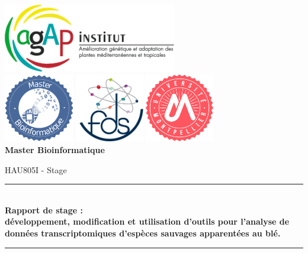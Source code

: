 \documentclass[../main]{subfiles} %
\begin{document}

\begin{titlepage}
\begin{center}
    \includegraphics[height=3cm]{Logos/logo_agap.png}\hspace{0.2cm}
    \\
	  \includegraphics[height=3cm]{Logos/logo_Bioinfo.png}\hspace{0.2cm}
	  \includegraphics[height=3cm]{Logos/logo_fds_rond.png}\hspace{0.2cm}
	  \includegraphics[height=3cm]{Logos/logo_UM.png}\hspace{0.2cm}\\[1cm]




{\Large \textbf{Master Bioinformatique}\\[1cm]}

{\large HAU805I - Stage\\ [0.7cm]}

\rule{\linewidth}{0.5mm} \\[0.4cm]
{ \huge \bfseries Rapport de stage :  \\ développement, modification et utilisation d'outils pour l'analyse de données transcriptomiques d'espèces sauvages apparentées au blé.}
\rule{\linewidth}{0.5mm} \\[1.5cm]


\end{center}
\end{titlepage}
\end{document}

